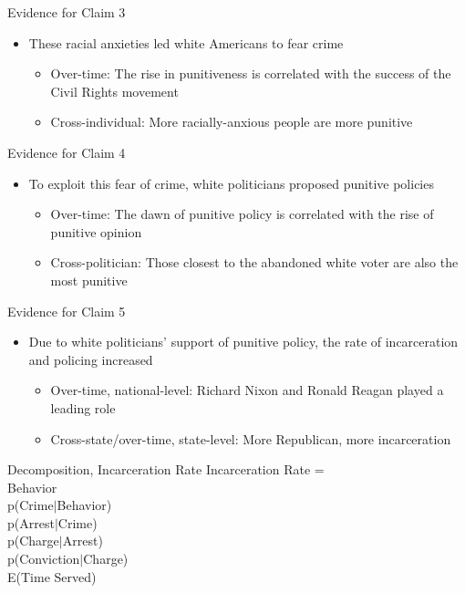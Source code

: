 \documentclass{beamer}
\newcommand{\claimthree}{These racial anxieties led white Americans to fear crime}
\newcommand{\claimfour}{To exploit this fear of crime, white politicians proposed punitive policies}
\newcommand{\claimfive}{Due to white politicians' support of punitive policy, the rate of incarceration and policing increased}
\begin{document}
\begin{frame}{Evidence for Claim 3}
\begin{itemize}
    \item[3.] \claimthree
    \begin{itemize}
        \item Over-time: The rise in punitiveness is correlated with the success of the Civil Rights movement
        \item Cross-individual: More racially-anxious people are more punitive
    \end{itemize}
\end{itemize}
\end{frame}

\begin{frame}{Evidence for Claim 4}
\begin{itemize}
    \item[4.] \claimfour
        \begin{itemize}
        \item Over-time: The dawn of punitive policy is correlated with the rise of punitive opinion
        \item Cross-politician: Those closest to the abandoned white voter are also the most punitive
    \end{itemize}
\end{itemize}
\end{frame}

\begin{frame}{Evidence for Claim 5}
\begin{itemize}
    \item[5.] \claimfive
    \begin{itemize}
        \item Over-time, national-level: Richard Nixon and Ronald Reagan played a leading role
        \item Cross-state/over-time, state-level: More Republican, more incarceration
    \end{itemize}
\end{itemize}
\end{frame}

\begin{frame}{Decomposition, Incarceration Rate}
Incarceration Rate = \\
Behavior \times \\ 
p(Crime$\mid$Behavior) \times \\ 
p(Arrest$\mid$Crime) \times \\ 
p(Charge$\mid$Arrest) \times \\ 
p(Conviction$\mid$Charge) \times \\ 
E(Time Served)
\end{frame}
\end{document}
